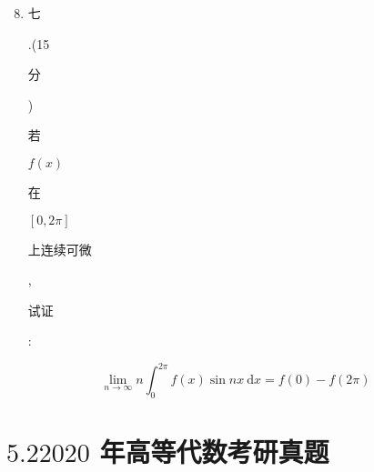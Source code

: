 \documentclass[10pt]{article}
\begin{document}
\begin{enumerate}
  \setcounter{enumi}{7}
  \item \begin{CJK}{UTF8}{mj}七\end{CJK}.(15 \begin{CJK}{UTF8}{mj}分\end{CJK}) \begin{CJK}{UTF8}{mj}若\end{CJK} $f(x)$ \begin{CJK}{UTF8}{mj}在\end{CJK} $[0,2 \pi]$ \begin{CJK}{UTF8}{mj}上连续可微\end{CJK}, \begin{CJK}{UTF8}{mj}试证\end{CJK}:
\end{enumerate}
$$
\lim _{n \rightarrow \infty} n \int_{0}^{2 \pi} f(x) \sin n x \mathrm{~d} x=f(0)-f(2 \pi)
$$

\section{$5.22020$ 年高等代数考研真题}
\end{document}
